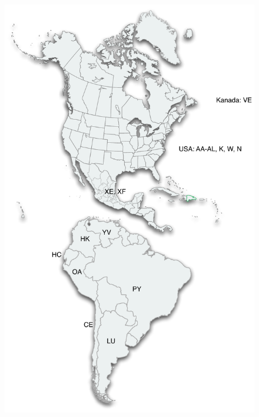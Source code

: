 \documentclass[11pt,BCOR=8.5mm]{scrartcl}
\begin{document}
\begin{figure}[h!]
  \begin{center}
	\includegraphics[width=14cm]{figures/landeskenner-amerika}
	\label{fig:landeskenner-amerika}
  \end{center}
\end{figure}
\end{document}
